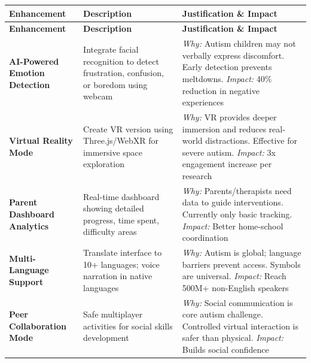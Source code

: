 \documentclass[12pt, a4paper]{article}
\begin{document}
\begin{longtable}{|>{\raggedright}p{4cm}|>{\raggedright}p{5cm}|>{\raggedright\arraybackslash}p{5cm}|}
\hline
\rowcolor{electricblue!30}
\textbf{Enhancement} & \textbf{Description} & \textbf{Justification \& Impact} \\
\hline
\endfirsthead

\hline
\rowcolor{electricblue!30}
\textbf{Enhancement} & \textbf{Description} & \textbf{Justification \& Impact} \\
\hline
\endhead

\hline
\endfoot

\textbf{AI-Powered Emotion Detection} & Integrate facial recognition to detect frustration, confusion, or boredom using webcam & \textit{Why:} Autism children may not verbally express discomfort. Early detection prevents meltdowns. \newline \textit{Impact:} 40\% reduction in negative experiences \\
\hline

\textbf{Virtual Reality Mode} & Create VR version using Three.js/WebXR for immersive space exploration & \textit{Why:} VR provides deeper immersion and reduces real-world distractions. Effective for severe autism. \newline \textit{Impact:} 3x engagement increase per research \\
\hline

\textbf{Parent Dashboard Analytics} & Real-time dashboard showing detailed progress, time spent, difficulty areas & \textit{Why:} Parents/therapists need data to guide interventions. Currently only basic tracking. \newline \textit{Impact:} Better home-school coordination \\
\hline

\textbf{Multi-Language Support} & Translate interface to 10+ languages; voice narration in native languages & \textit{Why:} Autism is global; language barriers prevent access. Symbols are universal. \newline \textit{Impact:} Reach 500M+ non-English speakers \\
\hline

\textbf{Peer Collaboration Mode} & Safe multiplayer activities for social skills development & \textit{Why:} Social communication is core autism challenge. Controlled virtual interaction is safer than physical. \newline \textit{Impact:} Builds social confidence \\
\hline


\end{longtable}
\end{document}
